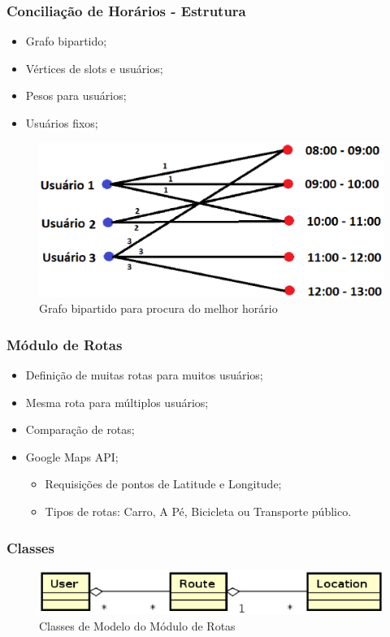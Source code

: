 \documentclass{beamer}
\begin{document}
\begin{frame}
\frametitle{Conciliação de Horários - Estrutura}

\begin{itemize}
	\item Grafo bipartido;
	\item Vértices de slots e usuários;
	\item Pesos para usuários;
	\item Usuários fixos;
\end{itemize}

\begin{figure}[h]
	\centering
	\includegraphics[scale=0.35]{figuras/melhor_horario.eps}
	\caption{Grafo bipartido para procura do melhor horário}
\end{figure}

\end{frame}

\begin{frame}
\frametitle{Módulo de Rotas}

\begin{itemize}
	\item Definição de muitas rotas para muitos usuários;
	\item Mesma rota para múltiplos usuários;
	\item Comparação de rotas;
	\item Google Maps API;
	\begin{itemize}
		\item Requisições de pontos de Latitude e Longitude;
		\item Tipos de rotas: Carro, A Pé, Bicicleta ou Transporte público.
	\end{itemize}
\end{itemize}

\end{frame}

\begin{frame}
\frametitle{Classes}

\begin{figure}[!h]
	\centering
	\includegraphics[scale=0.6]{figuras/modulo_rotas.eps}
	\caption{Classes de Modelo do Módulo de Rotas}
\end{figure}

\end{frame}
\end{document}
